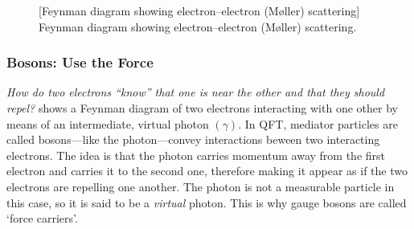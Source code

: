 \begin{figure}
    \centering
        [Feynman diagram showing electron--electron (Møller) scattering]
        {Feynman diagram showing electron--electron (Møller) scattering.}
    \label{fig:ee_scattering}
\end{figure}

\subsubsection{Bosons: Use the Force}

\emph{How do two electrons ``know'' that one is near the other and that they should repel?}
 shows a Feynman diagram of two electrons interacting with one other by means of an intermediate, virtual photon $(\gamma)$.
In QFT, mediator particles are called bosons---like the photon---convey interactions beween two interacting electrons.
The idea is that the photon carries momentum away from the first electron and carries it to the second one, therefore making it appear as if the two electrons are repelling one another.
The photon is not a measurable particle in this case, so it is said to be a \emph{virtual} photon.
This is why gauge bosons are called `force carriers'.

